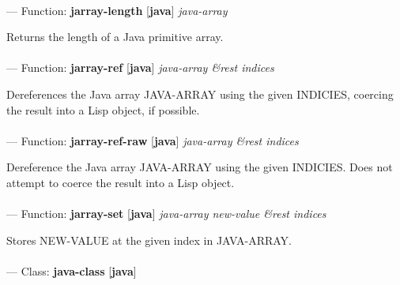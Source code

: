 \paragraph{}
\label{JAVA:JARRAY-LENGTH}
--- Function: \textbf{jarray-length} [\textbf{java}] \textit{java-array}

\begin{adjustwidth}{5em}{5em}
Returns the length of a Java primitive array.
\end{adjustwidth}

\paragraph{}
\label{JAVA:JARRAY-REF}
--- Function: \textbf{jarray-ref} [\textbf{java}] \textit{java-array \&rest indices}

\begin{adjustwidth}{5em}{5em}
Dereferences the Java array JAVA-ARRAY using the given INDICIES, coercing the result into a Lisp object, if possible.
\end{adjustwidth}

\paragraph{}
\label{JAVA:JARRAY-REF-RAW}
--- Function: \textbf{jarray-ref-raw} [\textbf{java}] \textit{java-array \&rest indices}

\begin{adjustwidth}{5em}{5em}
Dereference the Java array JAVA-ARRAY using the given INDICIES. Does not attempt to coerce the result into a Lisp object.
\end{adjustwidth}

\paragraph{}
\label{JAVA:JARRAY-SET}
--- Function: \textbf{jarray-set} [\textbf{java}] \textit{java-array new-value \&rest indices}

\begin{adjustwidth}{5em}{5em}
Stores NEW-VALUE at the given index in JAVA-ARRAY.
\end{adjustwidth}

\paragraph{}
\label{JAVA:JAVA-CLASS}
--- Class: \textbf{java-class} [\textbf{java}] \textit{}


